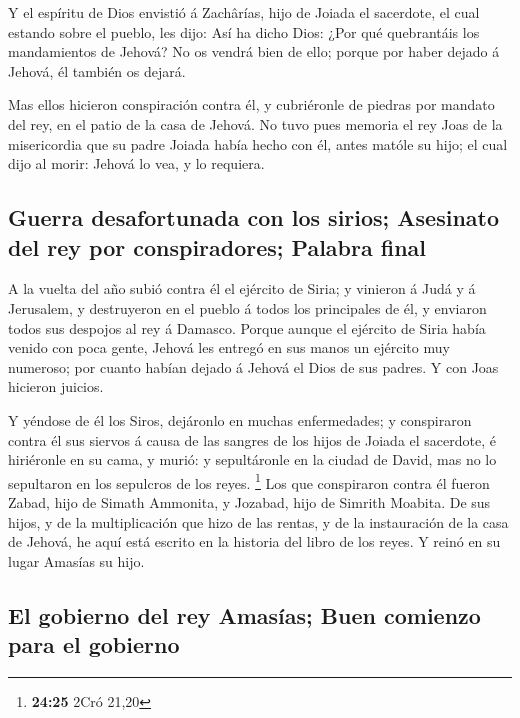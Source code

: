  Y el espíritu de Dios envistió á Zachârías, hijo de Joiada
el sacerdote, el cual estando sobre el pueblo, les dijo: Así ha dicho
Dios: ¿Por qué quebrantáis los mandamientos de Jehová? No os vendrá bien
de ello; porque por haber dejado á Jehová, él también os dejará.

 Mas ellos hicieron conspiración contra él, y cubriéronle
de piedras por mandato del rey, en el patio de la casa de Jehová.
 No tuvo pues memoria el rey Joas de la misericordia que su
padre Joiada había hecho con él, antes matóle su hijo; el cual dijo al
morir: Jehová lo vea, y lo requiera.

\hypertarget{guerra-desafortunada-con-los-sirios-asesinato-del-rey-por-conspiradores-palabra-final}{%
\subsection{Guerra desafortunada con los sirios; Asesinato del rey por
conspiradores; Palabra
final}\label{guerra-desafortunada-con-los-sirios-asesinato-del-rey-por-conspiradores-palabra-final}}

 A la vuelta del año subió contra él el ejército de Siria;
y vinieron á Judá y á Jerusalem, y destruyeron en el pueblo á todos los
principales de él, y enviaron todos sus despojos al rey á Damasco.
 Porque aunque el ejército de Siria había venido con poca
gente, Jehová les entregó en sus manos un ejército muy numeroso; por
cuanto habían dejado á Jehová el Dios de sus padres. Y con Joas hicieron
juicios.

 Y yéndose de él los Siros, dejáronlo en muchas
enfermedades; y conspiraron contra él sus siervos á causa de las sangres
de los hijos de Joiada el sacerdote, é hiriéronle en su cama, y murió: y
sepultáronle en la ciudad de David, mas no lo sepultaron en los
sepulcros de los reyes. \footnote{\textbf{24:25} 2Cró 21,20}
 Los que conspiraron contra él fueron Zabad, hijo de Simath
Ammonita, y Jozabad, hijo de Simrith Moabita.  De sus
hijos, y de la multiplicación que hizo de las rentas, y de la
instauración de la casa de Jehová, he aquí está escrito en la historia
del libro de los reyes. Y reinó en su lugar Amasías su hijo.

\hypertarget{el-gobierno-del-rey-amasuxedas-buen-comienzo-para-el-gobierno}{%
\subsection{El gobierno del rey Amasías; Buen comienzo para el
gobierno}\label{el-gobierno-del-rey-amasuxedas-buen-comienzo-para-el-gobierno}}

